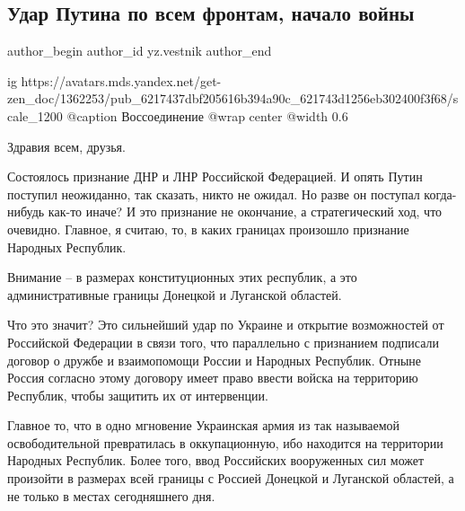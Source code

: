  
 
 
 
 
 
\subsection{Удар Путина по всем фронтам, начало войны}
\label{sec:24_02_2022.yz.vestnik.1.udar_putina}
 
\ifcmt
 author_begin
   author_id yz.vestnik
 author_end
\fi

\ifcmt
  ig https://avatars.mds.yandex.net/get-zen_doc/1362253/pub_6217437dbf205616b394a90c_621743d1256eb302400f3f68/scale_1200
  @caption Воссоединение
	@wrap center
	@width 0.6
\fi

Здравия всем, друзья.

Состоялось признание ДНР и ЛНР Российской Федерацией. И опять Путин поступил
неожиданно, так сказать, никто не ожидал. Но разве он поступал когда-нибудь
как-то иначе? И это признание не окончание, а стратегический ход, что очевидно.
Главное, я считаю, то, в каких границах произошло признание Народных Республик.

\begin{zznagolos}
Внимание – в размерах конституционных этих республик, а это административные границы Донецкой и Луганской областей.	
\end{zznagolos}

Что это значит? Это сильнейший удар по Украине и открытие возможностей от
Российской Федерации в связи того, что параллельно с признанием подписали
договор о дружбе и взаимопомощи России и Народных Республик. Отныне Россия
согласно этому договору имеет право ввести войска на территорию Республик,
чтобы защитить их от интервенции.

Главное то, что в одно мгновение Украинская армия из так называемой
освободительной превратилась в оккупационную, ибо находится на территории
Народных Республик. Более того, ввод Российских вооруженных сил может произойти
в размерах всей границы с Россией Донецкой и Луганской областей, а не только в
местах сегодняшнего дня.

